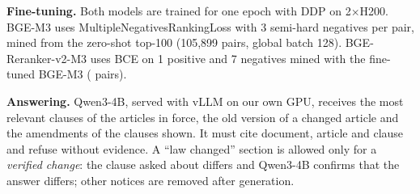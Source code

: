 \documentclass{article} %
\begin{document}
\textbf{Fine-tuning.} Both models are trained for one epoch with DDP on 2$\times$H200. BGE-M3 uses
MultipleNegativesRankingLoss with 3 semi-hard negatives per pair, mined from the zero-shot top-100 (105,899 pairs, global
batch 128). BGE-Reranker-v2-M3 uses BCE on 1 positive and 7 negatives mined with the fine-tuned BGE-M3 (\ResCePairs{}
pairs).

\textbf{Answering.} Qwen3-4B, served with vLLM on our own GPU, receives the most relevant clauses of the articles in force,
the old version of a changed article and the amendments of the clauses shown. It must cite document, article and
clause and refuse without evidence. A ``law changed'' section is allowed only for a \emph{verified change}: the clause
asked about differs and Qwen3-4B confirms that the answer differs; other notices are removed after generation.

\vspace{-1mm}
\end{document}
